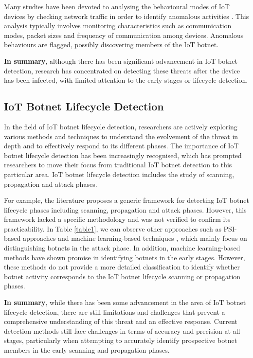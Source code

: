 \documentclass[journal]{IEEEtai}
\begin{document}
Many studies have been devoted to analysing the behavioural modes of IoT devices by checking network traffic in order to identify anomalous activities \cite{20222912361086}.
This analysis typically involves monitoring characteristics such as communication modes, packet sizes and frequency of communication among devices.
Anomalous behaviours are flagged, possibly discovering members of the IoT botnet.

\textbf{In summary}, although there has been significant advancement in IoT botnet detection, research has concentrated on detecting these threats after the device has been infected, with limited attention to the early stages or lifecycle detection.

\subsection{IoT Botnet Lifecycle Detection}
\label{IoT Botnet Lifecycle Detection}

In the field of IoT botnet lifecycle detection, researchers are actively exploring various methods and techniques to understand the evolvement of the threat in depth and to effectively respond to its different phases.
The importance of IoT botnet lifecycle detection has been increasingly recognised, which has prompted researchers to move their focus from traditional IoT botnet detection to this particular area.
IoT botnet lifecycle detection includes the study of scanning, propagation and attack phases.


For example, the literature \cite{9994166} proposes a generic framework for detecting IoT botnet lifecycle phases including scanning, propagation and attack phases.
However, this framework lacked a specific methodology and was not verified to confirm its practicability.
In Table \ref{table1}, we can observe other approaches such as PSI-based approaches \cite{NGUYEN2020128, nguyen_novel_2020} and machine learning-based techniques \cite{9875261}, which mainly focus on distinguishing botnets in the attack phase.
In addition, machine learning-based methods \cite{9627657, NGUYEN2022107525} have shown promise in identifying botnets in the early stages.
However, these methods do not provide a more detailed classification to identify whether botnet activity corresponds to the IoT botnet lifecycle scanning or propagation phases.

\textbf{In summary}, while there has been some advancement in the area of IoT botnet lifecycle detection, there are still limitations and challenges that prevent a comprehensive understanding of this threat and an effective response.
Current detection methods still face challenges in terms of accuracy and precision at all stages, particularly when attempting to accurately identify prospective botnet members in the early scanning and propagation phases.
\end{document}
